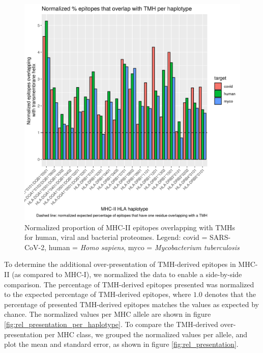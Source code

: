 \begin{figure}[!htbp]
  \includegraphics[width=\textwidth]{bbbq_1_smart_results/fig_f_tmh_mhc2_2_normalized.png}
  \caption{
    Normalized proportion of MHC-II epitopes overlapping with TMHs
    for human, viral and bacterial proteomes.
    Legend: covid = SARS-CoV-2,
    human = \emph{Homo sapiens}, myco = \emph{Mycobacterium tuberculosis}
  }
  \label{fig:f_tmh_mhc2_normalized}
\end{figure}

To determine the additional over-presentation of TMH-derived epitopes 
in MHC-II (as compared to MHC-I), we normalized the data to enable
a side-by-side comparison. 
The percentage of TMH-derived epitopes presented was normalized
to the expected percentage of TMH-derived epitopes,
where $1.0$ denotes that the percentage of presented TMH-derived epitopes
matches the values as expected by chance.
The normalized values per MHC allele are shown 
in figure \ref{fig:rel_presentation_per_haplotype}.
To compare the TMH-derived over-presentation per MHC class,
we grouped the normalized values per allele, 
and plot the mean and standard error, as shown in figure \ref{fig:rel_presentation}.


